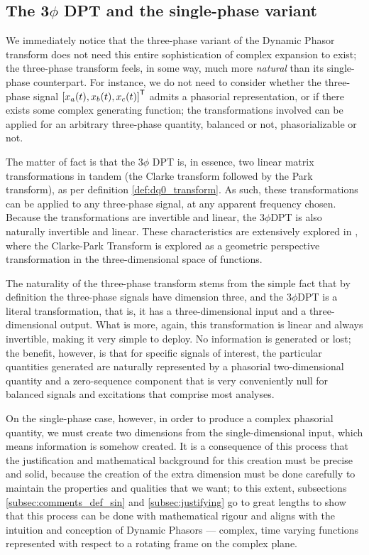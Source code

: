 \subsection{The 3$\phi$ DPT and the single-phase variant} %

	We immediately notice that the three-phase variant of the Dynamic Phasor transform does not need this entire sophistication of complex expansion to exist; the three-phase transform feels, in some way, much more \textit{natural} than its single-phase counterpart. For instance, we do not need to consider whether the three-phase signal $\left[x_a(t),x_b(t),x_c(t)\right]^{\mathsf{T}}$ admits a phasorial representation, or if there exists some complex generating function; the transformations involved can be applied for an arbitrary three-phase quantity, balanced or not, phasorializable or not.

	The matter of fact is that the 3$\phi$ DPT is, in essence, two linear matrix transformations in tandem (the Clarke transform followed by the Park transform), as per definition \ref{def:dq0_transform}. As such, these transformations can be applied to any three-phase signal, at any apparent frequency chosen. Because the transformations are invertible and linear, the 3$\phi$DPT is also naturally invertible and linear. These characteristics are extensively explored in \cite{orourkeGeometricInterpretationReference2019}, where the Clarke-Park Transform is explored as a geometric perspective transformation in the three-dimensional space of functions.

	The naturality of the three-phase transform stems from the simple fact that by definition the three-phase signals have dimension three, and the 3$\phi$DPT is a literal transformation, that is, it has a three-dimensional input and a three-dimensional output. What is more, again, this transformation is linear and always invertible, making it very simple to deploy. No information is generated or lost; the benefit, however, is that for specific signals of interest, the particular quantities generated are naturally represented by a phasorial two-dimensional quantity and a zero-sequence component that is very conveniently null for balanced signals and excitations that comprise most analyses.

	On the single-phase case, however, in order to produce a complex phasorial quantity, we must create two dimensions from the single-dimensional input, which means information is somehow created. It is a consequence of this process that the justification and mathematical background for this creation must be precise and solid, because the creation of the extra dimension must be done carefully to maintain the properties and qualities that we want; to this extent, subsections \ref{subsec:comments_def_sin} and \ref{subsec:justifying} go to great lengths to show that this process can be done with mathematical rigour and aligns with the intuition and conception of Dynamic Phasors — complex, time varying functions represented with respect to a rotating frame on the complex plane.

